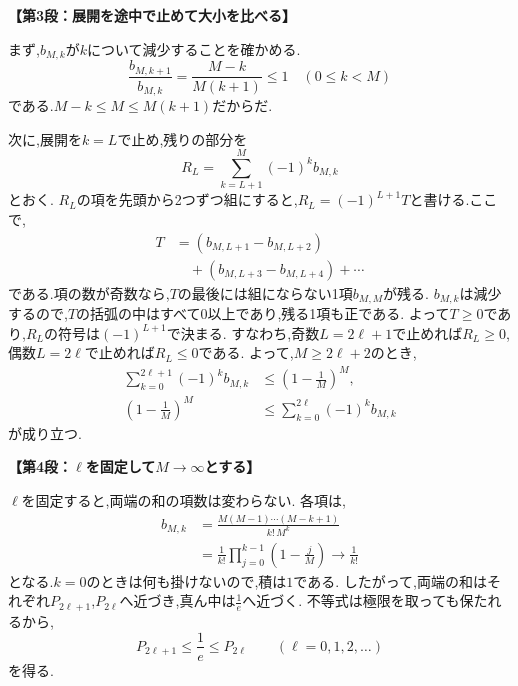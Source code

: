 \begin{enumerate}[label=\textbf{問\arabic*.},leftmargin=3.8em,format=\bookitemlink{practice-entrance}{solution}{problem}]
    \par\smallskip\noindent\textbf{【第3段：展開を途中で止めて大小を比べる】}\par\nopagebreak[4]
    まず,$b_{M,k}$が$k$について減少することを確かめる.
    \[
      \frac{b_{M,k+1}}{b_{M,k}}=\frac{M-k}{M(k+1)}\le1
      \quad(0\le k<M)
    \]
    である.$M-k\le M\le M(k+1)$だからだ.

    次に,展開を$k=L$で止め,残りの部分を
    \[
      R_L=\sum_{k=L+1}^{M}(-1)^kb_{M,k}
    \]
    とおく.
    $R_L$の項を先頭から2つずつ組にすると,$R_L=(-1)^{L+1}T$と書ける.ここで,
    \begin{align*}
      T&=(b_{M,L+1}-b_{M,L+2})\\
      &\quad+(b_{M,L+3}-b_{M,L+4})+\cdots
    \end{align*}
    である.項の数が奇数なら,$T$の最後には組にならない1項$b_{M,M}$が残る.
    $b_{M,k}$は減少するので,$T$の括弧の中はすべて0以上であり,残る1項も正である.
    よって$T\ge0$であり,$R_L$の符号は$(-1)^{L+1}$で決まる.
    すなわち,奇数$L=2\ell+1$で止めれば$R_L\ge0$,偶数$L=2\ell$で止めれば$R_L\le0$である.
    よって,$M\ge2\ell+2$のとき,
    \begin{align*}
      \sum_{k=0}^{2\ell+1}(-1)^kb_{M,k}
      &\le\left(1-\frac1M\right)^M,\\
      \left(1-\frac1M\right)^M
      &\le\sum_{k=0}^{2\ell}(-1)^kb_{M,k}
    \end{align*}
    が成り立つ.

    \par\smallskip\noindent\textbf{【第4段：$\ell$を固定して$M\to\infty$とする】}\par\nopagebreak[4]
    $\ell$を固定すると,両端の和の項数は変わらない.
    各項は,
    \begin{align*}
      b_{M,k}&=\frac{M(M-1)\cdots(M-k+1)}{k!\,M^k}\\
      &=\frac1{k!}\prod_{j=0}^{k-1}\left(1-\frac jM\right)
      \longrightarrow\frac1{k!}
    \end{align*}
    となる.$k=0$のときは何も掛けないので,積は$1$である.
    したがって,両端の和はそれぞれ$P_{2\ell+1}$,$P_{2\ell}$へ近づき,真ん中は$\frac1e$へ近づく.
    不等式は極限を取っても保たれるから,
    \[
      P_{2\ell+1}\le\frac1e\le P_{2\ell}
      \qquad(\ell=0,1,2,\ldots)
    \]
    を得る.


\end{enumerate}

